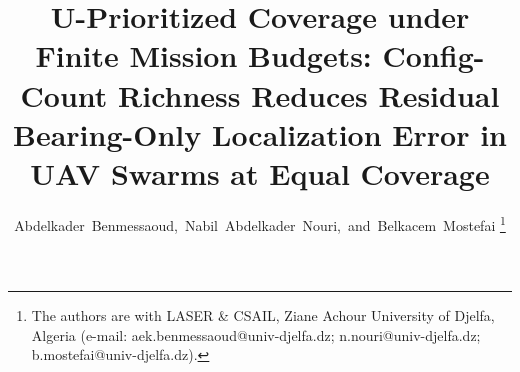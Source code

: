 \documentclass[journal]{IEEEtran}
\begin{document}
\title{U-Prioritized Coverage under Finite Mission Budgets: Config-Count
Richness Reduces Residual Bearing-Only Localization Error in UAV Swarms at
Equal Coverage}

\author{Abdelkader~Benmessaoud,~Nabil~Abdelkader~Nouri,~and~Belkacem~Mostefai%
\thanks{The authors are with LASER \& CSAIL, Ziane Achour University of
Djelfa, Algeria (e-mail: aek.benmessaoud@univ-djelfa.dz;
n.nouri@univ-djelfa.dz; b.mostefai@univ-djelfa.dz).}}


\maketitle
\end{document}
